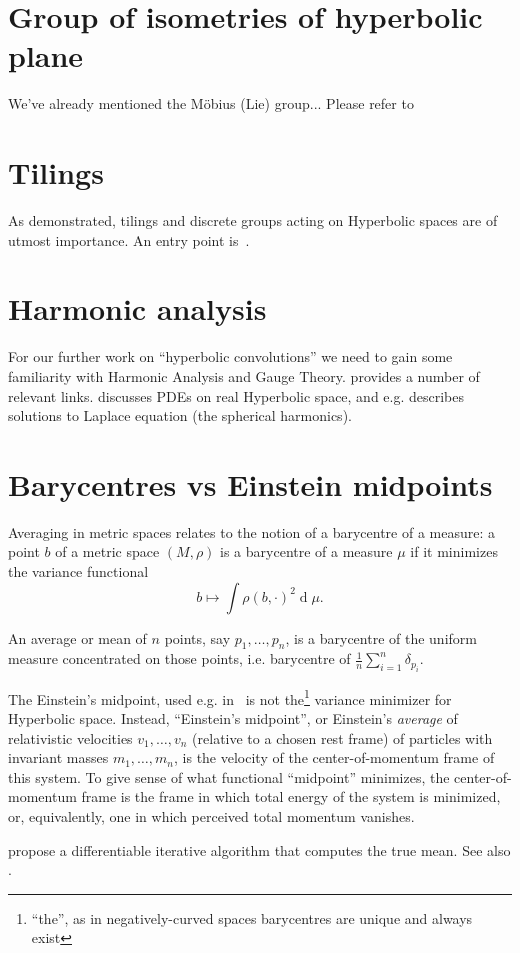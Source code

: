 \section*{Group of isometries of hyperbolic plane}

We've already mentioned the M\"obius (Lie) group...
Please refer to~\cite{beardonGeometryDiscrete,hubbardTeichmuller}

\section{Tilings}

As \citet{yaSaTilingBased} demonstrated, tilings and discrete groups acting on
Hyperbolic spaces are of utmost importance. An entry point is~\citet{gromov}.


\section{Harmonic analysis}

For our further work on ``hyperbolic convolutions'' we need to gain some
familiarity with Harmonic Analysis and Gauge Theory.
 provides a number of relevant links.
\citet{stollharmonic} discusses PDEs on real Hyperbolic space, and e.g.
describes solutions to Laplace equation (the spherical harmonics).

\section{Barycentres vs Einstein midpoints}

Averaging in metric spaces relates to the notion of a barycentre of a measure:
a point \( b \) of a metric space \( (M, \rho) \) is a barycentre of a measure
\( \mu \) if it minimizes the variance functional
\[ b \mapsto \int \rho(b, \cdot)^2\operatorname{d}\mu. \]

An average or mean of \( n \) points, say \( p_1, \ldots, p_n \), is a
barycentre of the uniform measure concentrated on those points, i.e. barycentre
of \( \frac1n\sum_{i=1}^n \delta_{p_i} \).

The Einstein's midpoint, used e.g. in~\cite{khrulkov} is not
the\footnote{``the'', as in negatively-curved spaces barycentres are unique and
always exist}
variance minimizer for Hyperbolic space. Instead, ``Einstein's midpoint'', or
Einstein's \emph{average} of relativistic velocities \( v_1, \ldots, v_n \)
(relative to a chosen rest frame) of particles with invariant masses \( m_1,
\ldots, m_n \), is the velocity of the center-of-momentum frame of
this system. To give sense of what functional ``midpoint'' minimizes, the
center-of-momentum frame is the frame in which total energy of the system is
minimized, or, equivalently, one in which perceived total momentum vanishes.

\citet{diffThroughFrechet} propose a differentiable iterative algorithm
that computes the true mean. See also \citet{gdFrechetHyperbolic}.
